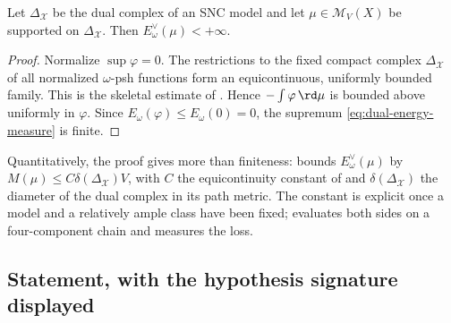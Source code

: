 \begin{lemma}
\label{lem:skeletal-measure-finite-energy}
Let $\Delta_{\mathcal X}$ be the dual complex of an SNC model and let
$\mu\in\mathcal M_V(X)$ be supported on $\Delta_{\mathcal X}$.  Then
$E_\omega^\vee(\mu)<+\infty$.
\end{lemma}

\begin{proof}
Normalize $\sup\varphi=0$.  The restrictions to the fixed compact complex
$\Delta_{\mathcal X}$ of all normalized $\omega$-psh functions form an
equicontinuous, uniformly bounded family.  This is the skeletal estimate of
.  Hence
$-\int\varphi\,\rd \mu$ is bounded above uniformly in $\varphi$.  Since
$E_\omega(\varphi)\leq E_\omega(0)=0$, the supremum
\eqref{eq:dual-energy-measure} is finite.
\end{proof}

Quantitatively, the proof gives more than finiteness:
 bounds
$E^\vee_\omega(\mu)$ by $M(\mu)\leq C\delta(\Delta_{\mathcal X})V$, with
$C$ the equicontinuity constant of
 and
$\delta(\Delta_{\mathcal X})$ the diameter of the dual complex in its path
metric.  The constant is explicit once a model and a relatively ample class
have been fixed;  evaluates both sides on a
four-component chain and measures the loss.

\subsection{Statement, with the hypothesis signature displayed}
\label{sec:ch28-bfj-statement}

\begin{center}
\end{center}


